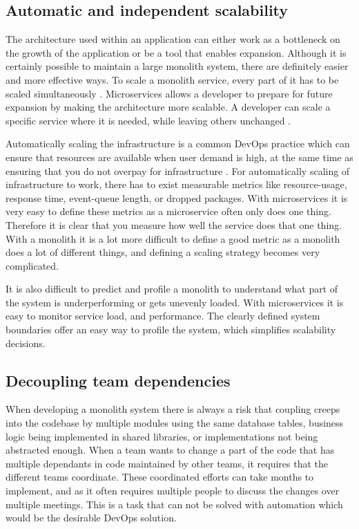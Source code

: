 \documentclass[a4paper]{article}
\begin{document}
\subsection{Automatic and independent scalability}
The architecture used within an application can either work as a bottleneck on the growth of the application or be a tool that enables expansion. Although it is certainly possible to maintain a large monolith system, there are definitely easier and more effective ways. To scale a monolith service, every part of it has to be scaled simultaneously \cite{Newman2015}. Microservices allows a developer to prepare for future expansion by making the architecture more scalable. A developer can scale a specific service where it is needed, while leaving others unchanged \cite{Newman2015}.

Automatically scaling the infrastructure is a common DevOps practice which can ensure that resources are available when user demand is high, at the same time as ensuring that you do not overpay for infrastructure \cite{Pinedo2015}. For automatically scaling of infrastructure to work, there has to exist measurable metrics like resource-usage, response time, event-queue length, or dropped packages. With microservices it is very easy to define these metrics as a microservice often only does one thing. Therefore it is clear that you measure how well the service does that one thing. With a monolith it is a lot more difficult to define a good metric as a monolith does a lot of different things, and defining a scaling strategy becomes very complicated.

It is also difficult to predict and profile a monolith to understand what part of the system is underperforming or gets unevenly loaded. With microservices it is easy to monitor service load, and performance. The clearly defined system boundaries offer an easy way to profile the system, which simplifies scalability decisions.

\subsection{Decoupling team dependencies}
\label{sec:benefits:team-dependencies}
When developing a monolith system there is always a risk that coupling creeps into the codebase by multiple modules using the same database tables, business logic being implemented in shared libraries, or implementations not being abstracted enough. When a team wants to change a part of the code that has multiple dependants in code maintained by other teams, it requires that the different teams coordinate. These coordinated efforts can take months to implement, and as it often requires multiple people to discuss the changes over multiple meetings. This is a task that can not be solved with automation which would be the desirable DevOps solution.
\end{document}

